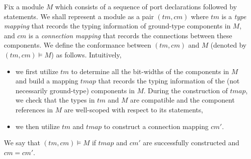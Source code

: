Fix a {\hifirrtl} module $M$ which consists of a sequence of port declarations followed by statements. We shall represent a {\lofirrtl} module  %
as a pair $(tm, cm)$ where $tm$ is a \emph{type mapping} that records the typing information of ground-type components in $M$, and $cm$ is a \emph{connection mapping} that records the connections between these components.
%
%
We define the conformance between $(tm, cm)$ and $M$ (denoted by $(tm, cm)\models M$)
as follows. Intuitively, %
\begin{itemize}
\item %
we first utilize $tm$ to determine all the bit-widths of the components in $M$ and build a mapping $tmap$ that records the typing information of the (not necessarily ground-type) components in $M$. During the construction of $tmap$, we check that the types in $tm$ and $M$ are compatible and the component references in $M$ are well-scoped with respect to its  statements,
\item %
	we then utilize $tm$ and $tmap$ %
	to construct a connection mapping $cm'$.
\end{itemize}
We say that $(tm, cm) \models M$ if $tmap$ and $cm'$ are successfully constructed and $cm = cm'$.

